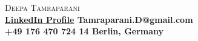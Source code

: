 \documentclass[10pt,A4]{article}
\begin{document}
\pagestyle{fancy}








\vspace{-8pt}
\begin{center}
  \begin{minipage}[t]{0.7\textwidth} %
    \vspace{0pt} %
    \textcolor{sectcol}{\HUGE \textsc{Deepa Tamraparani}}\\
    \small {\textbf{ \href{https://www.linkedin.com/in/deepa-tamraparani}{LinkedIn Profile} Tamraparani.D@gmail.com}}\\
    \small {\textbf{ +49 176 470 724 14 Berlin, Germany}}
    \vspace{1em} %
  \end{minipage}%
  \hfill %
  \begin{minipage}[t]{0.3\textwidth} %
    \raggedleft %
  \end{minipage}
\end{center}

\vspace{6pt}
\end{document}
